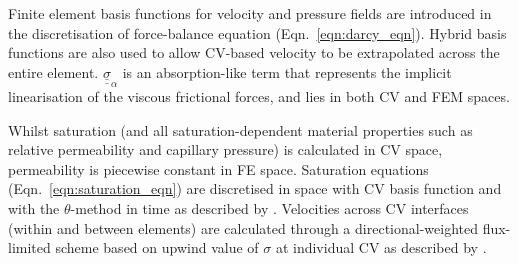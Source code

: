 \documentclass[preprint,authoryear,12pt]{elsarticle}
\begin{document}





\medskip
Finite element basis functions for velocity and pressure fields are introduced in the discretisation of force-balance equation (Eqn.~\ref{eqn:darcy_eqn}). Hybrid basis functions are also used to allow CV-based velocity to be extrapolated across the entire element. $\underline{\underline{\sigma}}_{\alpha}$ is an absorption-like term that represents the implicit linearisation of the viscous frictional forces, and lies in both CV and FEM spaces.

\medskip
Whilst saturation (and all saturation-dependent material properties such as relative permeability and capillary pressure) is calculated in CV space, permeability is piecewise constant in FE space. Saturation equations (Eqn.~\ref{eqn:saturation_eqn}) are discretised in space with CV basis function and with the $\theta$-method in time as described by \citet{gomes_book_2012}. Velocities across CV interfaces (within and between elements) are calculated through a directional-weighted flux-limited scheme based on upwind value of $\sigma$ at individual CV as described by \citet{jackson_2013}.
\end{document}
